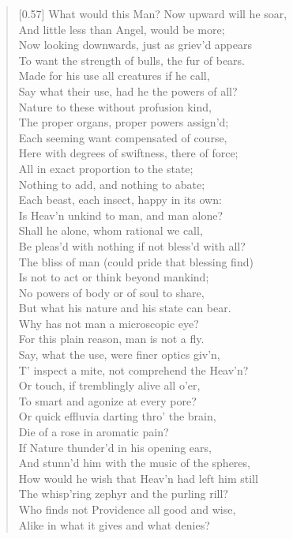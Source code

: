 \begin{verse}[0.57\textwidth]
What would this Man? Now upward will he soar,\\
And little less than Angel, would be more;\\
Now looking downwards, just as griev'd appears\\
To want the strength of bulls, the fur of bears.\\
Made for his use all creatures if he call,\\
Say what their use, had he the powers of all?\\
Nature to these without profusion kind,\\
The proper organs, proper powers assign'd;\\
Each seeming want compensated of course,\\
Here with degrees of swiftness, there of force;\\
All in exact proportion to the state;\\
Nothing to add, and nothing to abate;\\
Each beast, each insect, happy in its own:\\
Is Heav'n unkind to man, and man alone?\\
Shall he alone, whom rational we call,\\
Be pleas'd with nothing if not bless'd with all?\\
\vin The bliss of man (could pride that blessing find)\\
Is not to act or think beyond mankind;\\
No powers of body or of soul to share,\\
But what his nature and his state can bear.\\
Why has not man a microscopic eye?\\
For this plain reason, man is not a fly.\\
Say, what the use, were finer optics giv'n,\\
T' inspect a mite, not comprehend the Heav'n?\\
Or touch, if tremblingly alive all o'er,\\
To smart and agonize at every pore?\\
Or quick effluvia darting thro' the brain,\\
Die of a rose in aromatic pain?\\
If Nature thunder'd in his opening ears,\\
And stunn'd him with the music of the spheres,\\
How would he wish that Heav'n had left him still\\
The whisp'ring zephyr and the purling rill?\\
Who finds not Providence all good and wise,\\
Alike in what it gives and what denies?


\end{verse}
